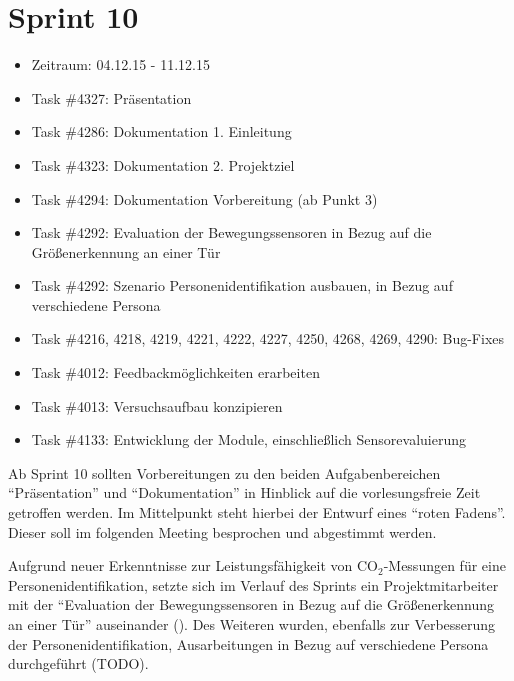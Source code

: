 \documentclass[12pt, oneside, smallheadings]{scrbook}
\begin{document}
\section{Sprint 10}
\begin{itemize}
	\item Zeitraum: 04.12.15 - 11.12.15 \newline
	\item Task \#4327: Präsentation
	\item Task \#4286: Dokumentation 1. Einleitung
	\item Task \#4323: Dokumentation 2. Projektziel
	\item Task \#4294: Dokumentation Vorbereitung (ab Punkt 3)
	\item Task \#4292: Evaluation der Bewegungssensoren in Bezug auf die Größenerkennung an einer Tür
	\item Task \#4292: Szenario Personenidentifikation ausbauen, in Bezug auf verschiedene Persona
	\item Task \#4216, 4218, 4219, 4221, 4222, 4227, 4250, 4268, 4269, 4290: Bug-Fixes
	\item Task \#4012: Feedbackmöglichkeiten erarbeiten
	\item Task \#4013: Versuchsaufbau konzipieren
	\item Task \#4133: Entwicklung der Module, einschließlich Sensorevaluierung\\
\end{itemize}
\noindent
Ab Sprint 10 sollten Vorbereitungen zu den beiden Aufgabenbereichen "`Präsentation"' und "`Dokumentation"' in Hinblick auf die vorlesungsfreie Zeit getroffen werden. Im Mittelpunkt steht hierbei der Entwurf eines "`roten Fadens"'. Dieser soll im folgenden Meeting besprochen und abgestimmt werden.

Aufgrund neuer Erkenntnisse zur Leistungsfähigkeit von CO$_2$-Messungen für eine Personenidentifikation, setzte sich im Verlauf des Sprints ein Projektmitarbeiter mit der "`Evaluation der Bewegungssensoren in Bezug auf die Größenerkennung an einer Tür"' auseinander (). Des Weiteren wurden, ebenfalls zur Verbesserung der Personenidentifikation, Ausarbeitungen in Bezug auf verschiedene Persona durchgeführt (TODO).
\end{document}
